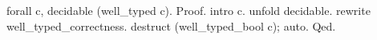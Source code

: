   forall c, decidable (well_typed c).
Proof.
  intro c. unfold decidable.
  rewrite well_typed_correctness.
  destruct (well_typed_bool c); auto.
Qed.